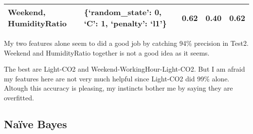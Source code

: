 \documentclass[11pt]{article}
\begin{document}
\begin{longtable}[]{@{}lllll@{}}
\begin{minipage}[t]{0.28\columnwidth}
Weekend, HumidityRatio\strut
\end{minipage} & \begin{minipage}[t]{0.39\columnwidth}\raggedright
\{`random\_state': 0, `C': 1, `penalty': `l1'\}\strut
\end{minipage} & \begin{minipage}[t]{0.06\columnwidth}\raggedright
0.62\strut
\end{minipage} & \begin{minipage}[t]{0.06\columnwidth}\raggedright
0.40\strut
\end{minipage} & \begin{minipage}[t]{0.06\columnwidth}\raggedright
0.62\strut
\end{minipage}\tabularnewline
\bottomrule
\end{longtable}

    My two features alone seem to did a good job by catching 94\% precision
in Test2. Weekend and HumidityRatio together is not a good idea as it
seems.

The best are Light-CO2 and Weekend-WorkingHour-Light-CO2. But I am
afraid my features here are not very much helpful since Light-CO2 did
99\% alone. Altough this accuracy is pleasing, my instincts bother me by
saying they are overfitted.

    \hypertarget{nauxefve-bayes}{%
\subsection{Naïve Bayes}\label{nauxefve-bayes}}
\end{document}
